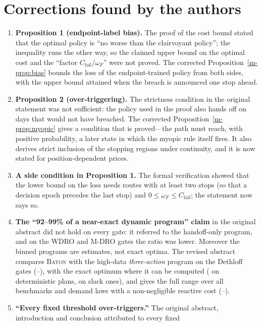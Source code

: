 \documentclass[11pt]{article}
\newcommand{\BATON}{\textsc{Baton}}
\begin{document}
\section*{Corrections found by the authors}

\begin{enumerate}[leftmargin=1.4em]
\item \textbf{Proposition 1 (endpoint-label bias).} The proof of the
  cost bound stated that the optimal policy is ``no worse than the
  clairvoyant policy''; the inequality runs the other way, so the
  claimed upper bound on the optimal cost and the ``factor
  $C_{\mathrm{fail}}/\omega_F$'' were not proved. The corrected
  Proposition~\ref{m-prop:bias} bounds the loss of the endpoint-trained
  policy from both sides, with the upper bound attained when the breach
  is announced one stop ahead.
\item \textbf{Proposition 2 (over-triggering).} The strictness condition
  in the original statement was not sufficient: the policy used in the
  proof also hands off on days that would not have breached. The
  corrected Proposition~\ref{m-prop:myopic} gives a condition that is
  proved---the path must reach, with positive probability, a later
  state in which the myopic rule itself fires. It also derives strict
  inclusion of the stopping regions under continuity, and it is now
  stated for position-dependent prices.
\item \textbf{A side condition in Proposition 1.} The formal
  verification showed that the lower bound on the loss needs routes with
  at least two stops (so that a decision epoch precedes the last stop)
  and $0 \le \omega_F \le C_{\mathrm{fail}}$; the statement now says so.
\item \textbf{The ``92--99\% of a near-exact dynamic program'' claim}
  in the original abstract did not hold on every gate: it referred to
  the handoff-only program, and on the \textsc{WDRO} and
  \textsc{M-DRO} gates the ratio was lower. Moreover the binned
  programs are estimates, not exact optima. The revised abstract compares
  \BATON{} with the high-data \emph{three-action} program on the Dethloff
  gates (\ratioDpThreeLo--\ratioDpThreeHi), with the exact optimum where
  it can be computed (\exDetShare{} on deterministic plans, \exSaaShare{}
  on slack ones), and gives the full range over all benchmarks and demand
  laws with a non-negligible reactive cost (\ratioAllLo--\ratioAllHi).
\item \textbf{``Every fixed threshold over-triggers.''} The original
  abstract, introduction and conclusion attributed to every fixed

\end{enumerate}
\end{document}
